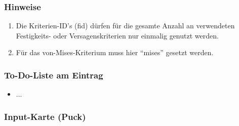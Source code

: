 \documentclass[11pt,titlepage,listof=totoc,bibliography=totoc,twoside]{scrreprt}
\begin{document}
{{\subsubsection{Hinweise}

\begin{enumerate}
\item Die Kriterien-ID's (fid) dürfen für die gesamte Anzahl an verwendeten Festigkeits- oder Versagenskriterien nur einmalig genutzt werden.
\item Für das von-Mises-Kriterium muss hier ``mises'' gesetzt werden.
\end{enumerate}

\subsubsection{To-Do-Liste am Eintrag}

\begin{itemize}
\item ...
\end{itemize}

\newpage

\subsubsection{Input-Karte (Puck)}

}}
\end{document}
